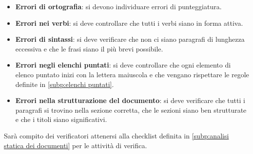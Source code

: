 \documentclass[../norme-di-progetto.tex]{subfiles}
\begin{document}
\begin{itemize}
		\item \textbf{Errori di ortografia}: si devono individuare errori di punteggiatura.
		\item \textbf{Errori nei verbi}: si deve controllare che tutti i verbi siano in forma attiva.
		\item \textbf{Errori di sintassi}: si deve verificare che non ci siano paragrafi di lunghezza eccessiva e che le frasi siano il più brevi possibile.
		\item \textbf{Errori negli elenchi puntati}: si deve controllare che ogni elemento di elenco puntato inizi con la lettera maiuscola e che vengano rispettare le regole definite in \ref{subp:elenchi puntati}.
		\item \textbf{Errori nella strutturazione del documento}: si deve verificare che tutti i paragrafi si trovino nella sezione corretta, che le sezioni siano ben strutturate e che i titoli siano significativi.
\end{itemize}
Sarà compito dei verificatori attenersi alla checklist definita in \ref{subp:analisi statica dei documenti} per le attività di verifica.
\end{document}
